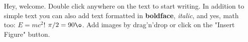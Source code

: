Hey, welcome. Double click anywhere on the text to start writing. In addition to simple text you can also add text formatted in \textbf{boldface}, \textit{italic}, and yes, math too: $E  =  mc^{2}$! $\pi/2 = 90\o$. Add images by drag'n'drop or click on the "Insert Figure" button.
  